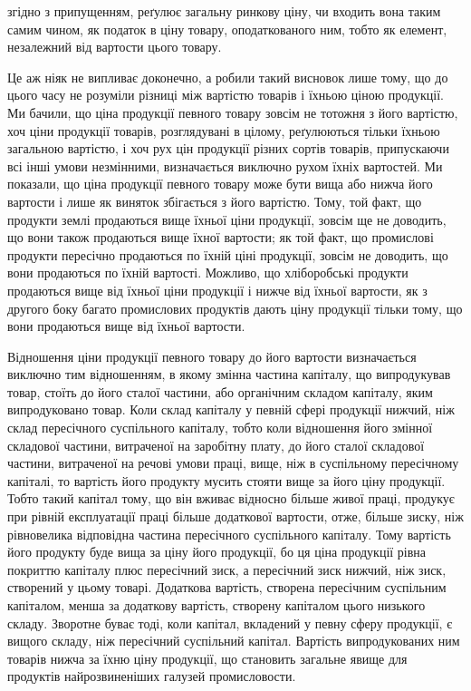 \parcont{}  %
згідно з припущенням, реґулює загальну ринкову ціну, чи входить вона таким самим чином, як податок в
ціну товару, оподаткованого ним, тобто як елемент, незалежний від вартости цього товару.

Це аж ніяк не випливає доконечно, а робили такий висновок лише тому,
що до цього часу не розуміли різниці між вартістю товарів і їхньою ціною
продукції. Ми бачили, що ціна продукції певного товару зовсім не тотожня
з його вартістю, хоч ціни продукції товарів, розглядувані в цілому, реґулюються
тільки їхньою загальною вартістю, і хоч рух цін продукції різних сортів
товарів, припускаючи всі інші умови незмінними, визначається виключно
рухом їхніх вартостей. Ми показали, що ціна продукції певного товару може
бути вища або нижча його вартости і лише як виняток збігається з його вартістю.
Тому, той факт, що продукти землі продаються вище їхньої ціни продукції,
зовсім ще не доводить, що вони також продаються вище їхної вартости; як той факт, що промислові
продукти пересічно продаються по їхній ціні продукції, зовсім не доводить, що вони продаються по
їхній вартості. Можливо, що хліборобські продукти продаються вище від їхньої ціни продукції і нижче
від їхньої вартости, як з другого боку багато промислових продуктів дають ціну продукції тільки
тому, що вони продаються вище від їхньої вартости.

Відношення ціни продукції певного товару до його вартости визначається
виключно тим відношенням, в якому змінна частина капіталу, що випродукував товар, стоїть до його
сталої частини, або органічним складом капіталу, яким випродуковано товар. Коли склад капіталу у
певній сфері продукції нижчий, ніж склад пересічного суспільного капіталу, тобто коли відношення
його змінної складової частини, витраченої на заробітну плату, до його сталої складової частини,
витраченої на речові умови праці, вище, ніж в суспільному пересічному капіталі, то вартість його
продукту мусить стояти вище за його ціну продукції. Тобто такий капітал тому, що він вживає відносно
більше живої праці, продукує при рівній експлуатації праці більше додаткової вартости, отже, більше
зиску, ніж рівновелика відповідна частина пересічного суспільного капіталу. Тому вартість його
продукту буде вища за ціну його продукції, бо ця ціна продукції рівна покриттю капіталу плюс
пересічний зиск, а пересічний зиск нижчий, ніж зиск, створений у цьому товарі. Додаткова вартість,
створена пересічним суспільним капіталом, менша за додаткову вартість, створену капіталом цього
низького складу. Зворотне буває тоді, коли капітал, вкладений у певну сферу продукції, є вищого
складу, ніж пересічний суспільний капітал. Вартість випродукованих ним товарів нижча за їхню ціну
продукції, що становить загальне явище для продуктів найрозвиненіших галузей промисловости.

